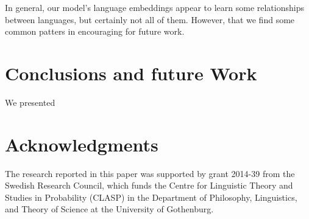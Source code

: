 \documentclass[11pt,a4paper]{article}
\begin{document}
In general, our model's language embeddings appear to learn some
relationships between languages, but certainly not all of
them. However, that we find some common patters in encouraging for
future work.

\section{Conclusions and future Work}

We presented 


\section*{Acknowledgments}

The research reported in this paper was supported by grant 2014-39
from the Swedish Research Council, which funds the Centre for
Linguistic Theory and Studies in Probability (CLASP) in the Department
of Philosophy, Linguistics, and Theory of Science at the University
of Gothenburg.

 



\end{document}
